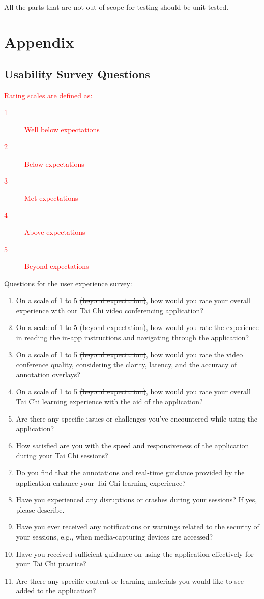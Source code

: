 \documentclass[12pt, titlepage]{article}
\newcommand{\rt}[1]{\textcolor{red}{#1}}
\begin{document}
All the parts that are not out of scope for testing should be unit\rt{-}tested.

\newpage

\section{Appendix}

\subsection{Usability Survey Questions}
\label{sec:survey}

\rt{Rating scales are defined as:}
\begin{description}
  \item[\rt{1}] \rt{Well below expectations}
  \item[\rt{2}] \rt{Below expectations}
  \item[\rt{3}] \rt{Met expectations}
  \item[\rt{4}] \rt{Above expectations}
  \item[\rt{5}] \rt{Beyond expectations}
\end{description}

Questions for the user experience survey:

\begin{enumerate}
\item On a scale of 1 to 5 \sout{(beyond expectation)}, how would you rate your overall
  experience with our Tai Chi video conferencing application?
\item On a scale of 1 to 5 \sout{(beyond expectation)}, how would you rate the experience
  in reading the in-app instructions and navigating through the application?
\item On a scale of 1 to 5 \sout{(beyond expectation)}, how would you rate the video
  conference quality, considering the clarity, latency, and the accuracy of
  annotation overlays?
\item On a scale of 1 to 5 \sout{(beyond expectation)}, how would you rate your overall
  Tai Chi learning experience with the aid of the application?
\item Are there any specific issues or challenges you've encountered while using
  the application?
\item How satisfied are you with the speed and responsiveness of the application
  during your Tai Chi sessions?
\item Do you find that the annotations and real-time guidance provided by the
  application enhance your Tai Chi learning experience?
\item Have you experienced any disruptions or crashes during your sessions? If yes,
  please describe.
\item Have you ever received any notifications or warnings related to the security
  of your sessions, e.g., when media-capturing devices are accessed?
\item Have you received sufficient guidance on using the application effectively
  for your Tai Chi practice?
\item Are there any specific content or learning materials you would like to see
  added to the application?
\end{enumerate}
\end{document}
